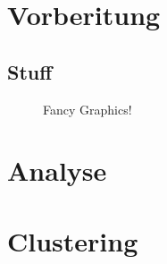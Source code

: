 

\section{Vorberitung}
\label{sec:preperation}

\subsection{Stuff}
\begin{figure}[H]
    \center
    \caption{Fancy Graphics!}
    \label{fig:im}
\end{figure}




\section{Analyse}
\label{sec:analyse}




\section{Clustering}
\label{sec:cluster}